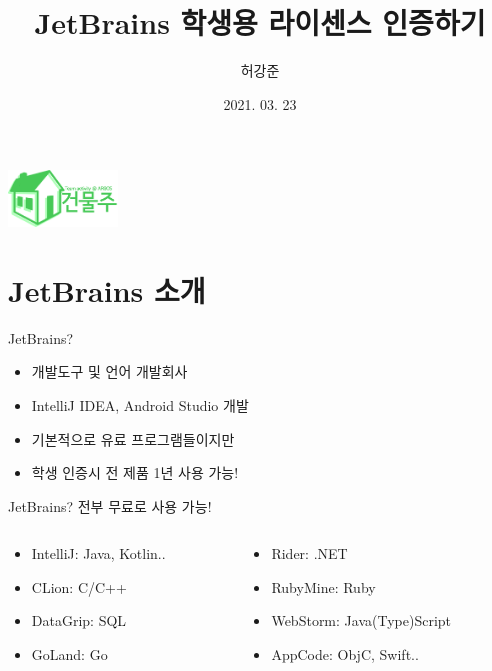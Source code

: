 \documentclass{beamer}
\title{JetBrains 학생용 라이센스 인증하기}
\author{허강준}
\institute{충남대학교 정보보호동아리 ARGOS}
\date{2021. 03. 23}
\begin{document}
\begin{frame}
    \begin{center}
        \includegraphics[height=1.5cm]{../Images/logo.png}
    \end{center}

    \maketitle
\end{frame}

\section{JetBrains 소개}
    \begin{frame}{JetBrains?}
        \begin{itemize}
            \item 개발도구 및 언어 개발회사
            \item IntelliJ IDEA, Android Studio 개발
            \item 기본적으로 유료 프로그램들이지만
            \item 학생 인증시 전 제품 1년 사용 가능!
        \end{itemize}
    \end{frame}

    \begin{frame}{JetBrains?}
        전부 무료로 사용 가능!
        \begin{columns}
            \begin{column}{0.45\textwidth}
                \begin{itemize}
                    \item IntelliJ: Java, Kotlin..
                    \item CLion: C/C++
                    \item DataGrip: SQL
                    \item GoLand: Go
                \end{itemize}
            \end{column}
            \begin{column}{0.55\textwidth}
                \begin{itemize}
                    \item Rider: .NET
                    \item RubyMine: Ruby
                    \item WebStorm: Java(Type)Script
                    \item AppCode: ObjC, Swift..
                \end{itemize}
            \end{column}
        \end{columns}
    \end{frame}
\end{document}
